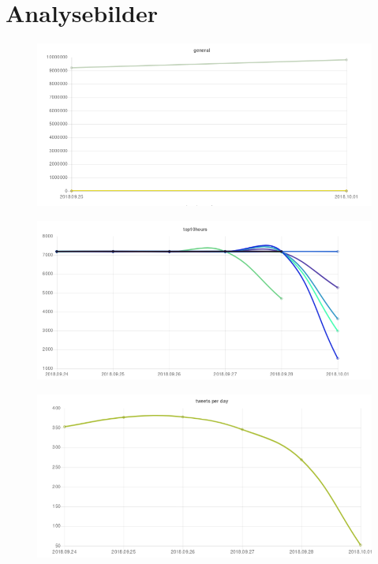 \section{Analysebilder}
\begin{figure}
\centering
\includegraphics[width=\textwidth]{bilder/BilderAnalyse-img1.png}
\end{figure}
\begin{figure}
\centering
\includegraphics[width=\textwidth]{bilder/BilderAnalyse-img2.png}
\end{figure}
\begin{figure}
\centering
\includegraphics[width=\textwidth]{bilder/BilderAnalyse-img3.png}
\end{figure}

